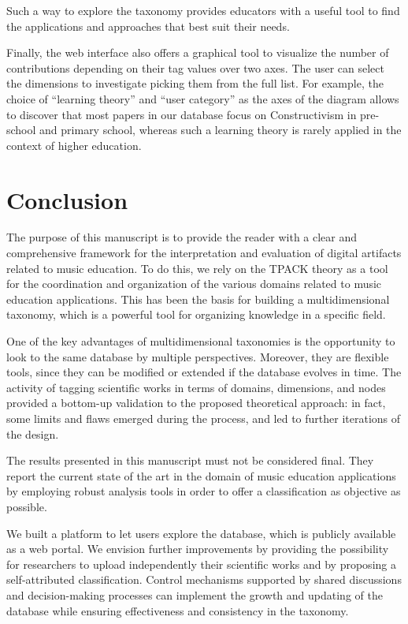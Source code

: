 \documentclass[10pt,journal,compsoc]{IEEEtran}
\begin{document}
Such a way to explore the taxonomy provides educators with a useful tool to find the applications and approaches that best suit their needs.

Finally, the web interface also offers a graphical tool to visualize the number of contributions depending on their tag values over two axes. The user can select the dimensions to investigate picking them from the full list. For example, the choice of ``learning theory'' and ``user category'' as the axes of the diagram allows to discover that most papers in our database focus on Constructivism in pre-school and primary school, whereas such a learning theory is rarely applied in the context of higher education.


\section{Conclusion}
\label{sec:conc}

The purpose of this manuscript is to provide the reader with a clear and comprehensive framework for the interpretation and evaluation of digital artifacts related to music education. To do this, we rely on the TPACK theory as a tool for the coordination and organization of the various domains related to music education applications. This has been the basis for building a multidimensional taxonomy, which is a powerful tool for organizing knowledge in a specific field. 

One of the key advantages of multidimensional taxonomies is the opportunity to look to the same database by multiple perspectives. Moreover, they are flexible tools, since they can be modified or extended if the database evolves in time. 
The activity of tagging scientific works in terms of domains, dimensions, and nodes provided a bottom-up validation to the proposed theoretical approach: in fact, some limits and flaws emerged during the process, and led to further iterations of the design.

The results presented in this manuscript must not be considered final. They report the current state of the art in the domain of music education applications by employing robust analysis tools in order to offer a classification as objective as possible. 

We built a platform to let users explore the database, which is publicly available as a web portal. We envision further improvements by providing the possibility for researchers to upload independently their scientific works and by proposing a self-attributed classification. Control mechanisms supported by shared discussions and decision-making processes can implement the growth and updating of the database while ensuring effectiveness and consistency in the taxonomy.
\end{document}
